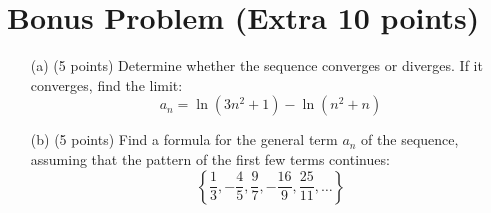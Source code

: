 \section*{Bonus Problem (Extra 10 points)}
\begin{enumerate}
    \item[(a)] (5 points) Determine whether the sequence converges or diverges. If it converges, find the limit: \\
    \[
    a_n = \ln(3n^2 + 1) - \ln(n^2 + n)
    \]
    \item[(b)] (5 points) Find a formula for the general term \( a_n \) of the sequence, assuming that the pattern of the first few terms continues: \\
    \[
    \left\{ \frac{1}{3}, -\frac{4}{5}, \frac{9}{7}, -\frac{16}{9}, \frac{25}{11}, \dots \right\}
    \]
\end{enumerate}
